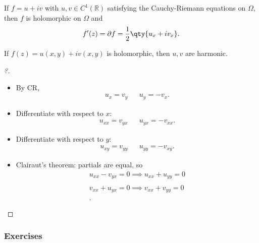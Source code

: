\begin{proposition}

If \(f = u+iv\) with \(u, v\in C^1({\mathbb{R}})\) satisfying the
Cauchy-Riemann equations on \(\Omega\), then \(f\) is holomorphic on
\(\Omega\) and
\begin{align*}
f'(z) = {\partial}f = {1\over 2}\qty{u_x + iv_x}
.\end{align*}

\end{proposition}

\begin{proposition}

If \(f(z) = u(x, y) + iv(x, y)\) is holomorphic, then \(u, v\) are
harmonic.

\end{proposition}

\begin{proof}[?]

\envlist

\begin{itemize}
\item
  By CR,
  \begin{align*}
  u_x = v_y && u_y = -v_x
  .\end{align*}
\item
  Differentiate with respect to \(x\):
  \begin{align*}
  u_{xx} = v_{yx} && u_{yx} = -v_{xx}
  .\end{align*}
\item
  Differentiate with respect to \(y\):
  \begin{align*}
  u_{xy} = v_{yy} && u_{yy} = -v_{xy}
  .\end{align*}
\item
  Clairaut's theorem: partials are equal, so
  \begin{align*}
  u_{xx} - v_{yx} = 0 \implies u_{xx} + u_{yy} = 0 \\ \\
  v_{xx} + u_{yx} = 0 \implies v_{xx} + v_{yy} = 0 \\ \\
  .\end{align*}
\end{itemize}

\end{proof}

\hypertarget{exercises-1}{%
\subsubsection{Exercises}\label{exercises-1}}


